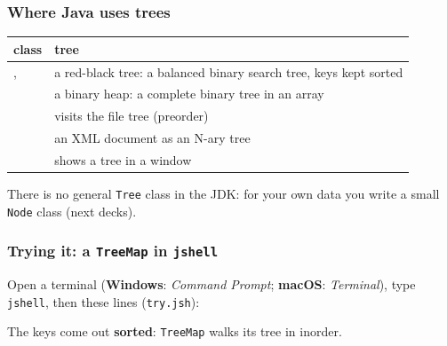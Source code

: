 \documentclass[aspectratio=169,10pt,compress]{beamer}
\newcommand{\win}{\textbf{Windows}}
\newcommand{\mac}{\textbf{macOS}}
\begin{document}
\begin{frame}[t,fragile] \frametitle{Where Java uses trees}
  \begin{center}\small
  \begin{tabular}{lL{0.5\textwidth}}
    \toprule
    \textbf{class}                        & \textbf{tree} \\
    \midrule
    ,  & a red-black tree: a balanced binary search tree, keys kept sorted \\
          & a binary heap: a complete binary tree in an array \\
         & visits the file tree (preorder) \\
                 & an XML document as an N-ary tree \\
                & shows a tree in a window \\
    \bottomrule
  \end{tabular}
  \end{center}
  \vspace{0.3em}
  \small There is no general \texttt{Tree} class in the JDK: for your own data you write a small \texttt{Node} class (next decks).
\end{frame}




\begin{frame}[t,fragile] \frametitle{Trying it: a \texttt{TreeMap} in \texttt{jshell}}
  \small Open a terminal (\win: \emph{Command Prompt}; \mac: \emph{Terminal}), type \texttt{jshell}, then these lines (\texttt{try.jsh}):


  \vspace{0.1em}
  \small
  The keys come out \textbf{sorted}: \texttt{TreeMap} walks its tree in inorder.
\end{frame}

\end{document}
